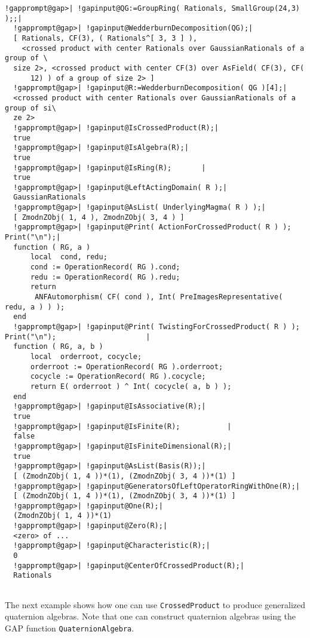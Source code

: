 \documentclass[a4paper,11pt]{report}
\begin{document}
{{{\begin{Verbatim}[commandchars=!@|,fontsize=\small,frame=single,label=Example]
  !gapprompt@gap>| !gapinput@QG:=GroupRing( Rationals, SmallGroup(24,3) );;|
  !gapprompt@gap>| !gapinput@WedderburnDecomposition(QG);|
  [ Rationals, CF(3), ( Rationals^[ 3, 3 ] ),
    <crossed product with center Rationals over GaussianRationals of a group of \
  size 2>, <crossed product with center CF(3) over AsField( CF(3), CF(
      12) ) of a group of size 2> ]
  !gapprompt@gap>| !gapinput@R:=WedderburnDecomposition( QG )[4];|
  <crossed product with center Rationals over GaussianRationals of a group of si\
  ze 2>
  !gapprompt@gap>| !gapinput@IsCrossedProduct(R);|
  true
  !gapprompt@gap>| !gapinput@IsAlgebra(R);|
  true
  !gapprompt@gap>| !gapinput@IsRing(R);       |
  true
  !gapprompt@gap>| !gapinput@LeftActingDomain( R );|
  GaussianRationals
  !gapprompt@gap>| !gapinput@AsList( UnderlyingMagma( R ) );|
  [ ZmodnZObj( 1, 4 ), ZmodnZObj( 3, 4 ) ]
  !gapprompt@gap>| !gapinput@Print( ActionForCrossedProduct( R ) ); Print("\n");|
  function ( RG, a )
      local  cond, redu;
      cond := OperationRecord( RG ).cond;
      redu := OperationRecord( RG ).redu;
      return
       ANFAutomorphism( CF( cond ), Int( PreImagesRepresentative( redu, a ) ) );
  end
  !gapprompt@gap>| !gapinput@Print( TwistingForCrossedProduct( R ) ); Print("\n");                     |
  function ( RG, a, b )
      local  orderroot, cocycle;
      orderroot := OperationRecord( RG ).orderroot;
      cocycle := OperationRecord( RG ).cocycle;
      return E( orderroot ) ^ Int( cocycle( a, b ) );
  end
  !gapprompt@gap>| !gapinput@IsAssociative(R);|
  true
  !gapprompt@gap>| !gapinput@IsFinite(R);           |
  false
  !gapprompt@gap>| !gapinput@IsFiniteDimensional(R);|
  true
  !gapprompt@gap>| !gapinput@AsList(Basis(R));|
  [ (ZmodnZObj( 1, 4 ))*(1), (ZmodnZObj( 3, 4 ))*(1) ] 
  !gapprompt@gap>| !gapinput@GeneratorsOfLeftOperatorRingWithOne(R);|
  [ (ZmodnZObj( 1, 4 ))*(1), (ZmodnZObj( 3, 4 ))*(1) ]
  !gapprompt@gap>| !gapinput@One(R);|
  (ZmodnZObj( 1, 4 ))*(1)
  !gapprompt@gap>| !gapinput@Zero(R);|
  <zero> of ...
  !gapprompt@gap>| !gapinput@Characteristic(R);|
  0
  !gapprompt@gap>| !gapinput@CenterOfCrossedProduct(R);|
  Rationals
  
\end{Verbatim}
 The next example shows how one can use \texttt{CrossedProduct} to produce generalized quaternion algebras. Note that one can construct
quaternion algebras using the \textsf{GAP} function \texttt{QuaternionAlgebra}.  
\begin{Verbatim}[commandchars=@|B,fontsize=\small,frame=single,label=Example]
  

\end{Verbatim}}}}
\end{document}
